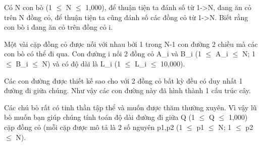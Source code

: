 Có N con bò (1  $\le$  N  $\le$  1,000), để thuận tiện ta đánh số từ 1->N, đang ăn cỏ trên N đồng cỏ, để thuận tiện ta cũng đánh số các đồng cỏ từ 1->N. Biết rằng con bò i đang ăn cỏ trên đồng cỏ i.  

   Một vài cặp đồng cỏ được nối với nhau bởi 1 trong N-1 con đường 2 chiều mà các con bò có thể đi qua. Con đường i nối 2 đồng cỏ A\_i và B\_i (1  $\le$  A\_i  $\le$  N; 1  $\le$  B\_i  $\le$  N) và có độ dài là L\_i (1  $\le$  L\_i  $\le$  10,000).  

   Các con đường được thiết kế sao cho với 2 đồng cỏ bất kỳ đều có duy nhất 1 đường đi giữa chúng. Như vậy các con đường này đã hình thành 1 cấu trúc cây.  

   Các chú bò rất có tinh thần tập thể và muốn được thăm thường xuyên. Vì vậy lũ bò muốn bạn giúp chúng tính toán độ dài đường đi giữa Q (1  $\le$  Q  $\le$  1,000) cặp đồng cỏ (mỗi cặp được mô tả là 2 số nguyên p1,p2 (1  $\le$  p1  $\le$  N; 1  $\le$  p2  $\le$  N).